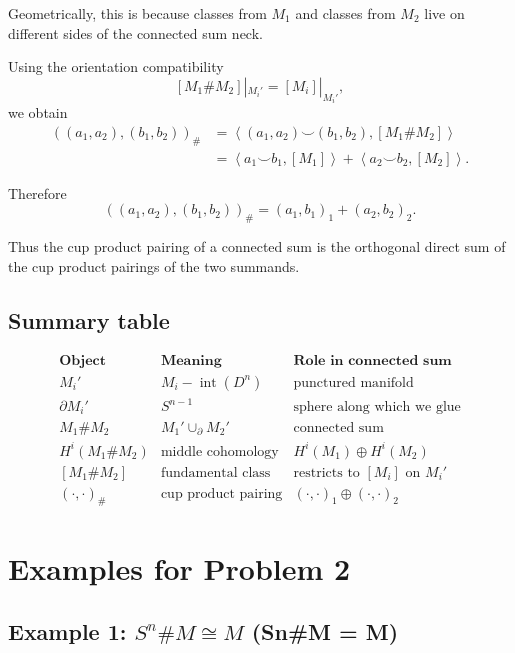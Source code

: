 \documentclass[12pt,a4paper]{article}
\theoremstyle{notespace}
\begin{document}
Geometrically, this is because classes from \(M_1\) and classes from \(M_2\)
live on different sides of the connected sum neck.

Using the orientation compatibility
\[
[M_1\#M_2]|_{M_i'}
=
[M_i]|_{M_i'},
\]
we obtain
\[
\begin{aligned}
	((a_1,a_2),(b_1,b_2))_{\#}
	&=
	\left\langle
	(a_1,a_2)\smile (b_1,b_2),
	[M_1\#M_2]
	\right\rangle
	\\[4pt]
	&=
	\left\langle
	a_1\smile b_1,[M_1]
	\right\rangle
	+
	\left\langle
	a_2\smile b_2,[M_2]
	\right\rangle.
\end{aligned}
\]

Therefore
\[
\boxed{
	((a_1,a_2),(b_1,b_2))_{\#}
	=
	(a_1,b_1)_1+(a_2,b_2)_2.
}
\]

Thus the cup product pairing of a connected sum is the orthogonal direct sum
of the cup product pairings of the two summands.

\subsection{Summary table}

\renewcommand{\arraystretch}{1.35}

\[
\begin{array}{c|c|c}
	\textbf{Object} & \textbf{Meaning} & \textbf{Role in connected sum}\\
	\hline
	M_i' & M_i-\operatorname{int}(D^n) & \text{punctured manifold}\\
	\partial M_i' & S^{n-1} & \text{sphere along which we glue}\\
	M_1\#M_2 & M_1'\cup_{\partial}M_2' & \text{connected sum}\\
	H^i(M_1\#M_2) & \text{middle cohomology} & H^i(M_1)\oplus H^i(M_2)\\
	\left[M_1\# M_2\right] & \text{fundamental class} & \text{restricts to }[M_i]\text{ on }M_i'\\
	(\cdot,\cdot)_{\#} & \text{cup product pairing} & (\cdot,\cdot)_1\oplus(\cdot,\cdot)_2
\end{array}
\]


\section{Examples for Problem 2}

\subsection{Example 1: $S^n\# M \cong M$ (Sn\#M = M)}
\end{document}
